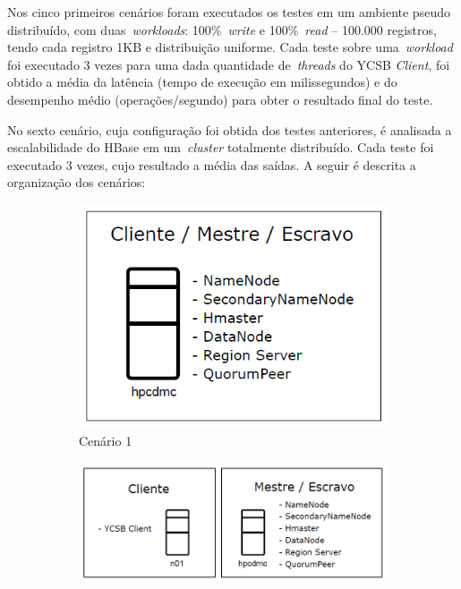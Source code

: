 \documentclass[12pt]{article}
\begin{document}
Nos cinco primeiros cenários foram executados os testes em um ambiente pseudo distribuído, com duas~\emph{workloads}: 100\%~\emph{write} e 100\%~\emph{read} -- 100.000 registros, tendo cada registro 1KB e distribuição uniforme. Cada teste sobre uma~\emph{workload} foi executado 3 vezes para uma dada quantidade de~\emph{threads} do YCSB \textit{Client}, foi obtido a média da latência (tempo de execução em milissegundos) e do desempenho médio (operações/segundo) para obter o resultado final do teste.

No sexto cenário, cuja configuração foi obtida dos testes anteriores, é analisada a escalabilidade do HBase em um~\emph{cluster} totalmente distribuído. Cada teste foi executado 3 vezes, cujo resultado a média das saídas. A seguir é descrita a organização dos cenários:

\begin{figure}
	\centering
	\hspace{0.2cm}
    \begin{subfigure}{0.2\textwidth}
    	\centering
        \includegraphics[width=1.0\textwidth]{images/cenario-1.png}
        \caption{Cenário 1}
        \label{figura2a}
    \end{subfigure}
    \hspace{0.3cm}
    \begin{subfigure}{0.3\textwidth}   
    	\centering
        \includegraphics[width=1.1\textwidth]{images/cenario-2.png}

\end{subfigure}
\end{figure}
\end{document}
